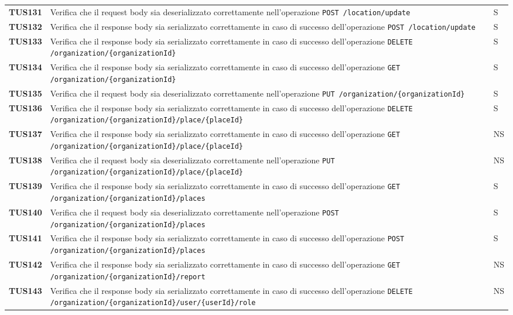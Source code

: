 \documentclass[../../piano-di-qualifica.tex]{subfiles}
\begin{document}
\begin{longtable}[H]{>{\centering\bfseries}m{3cm} >{}m{10cm} >{\centering\arraybackslash}m{3cm}}

  TUS131 & Verifica che il request body sia deserializzato correttamente nell'operazione \verb|POST /location/update| & S \\
  TUS132 & Verifica che il response body sia serializzato correttamente in caso di successo dell'operazione \verb|POST /location/update| & S \\
  TUS133 & Verifica che il response body sia serializzato correttamente in caso di successo dell'operazione \verb|DELETE /organization/{organizationId}| & S \\
  TUS134 & Verifica che il response body sia serializzato correttamente in caso di successo dell'operazione \verb|GET /organization/{organizationId}| & S \\
  TUS135 & Verifica che il request body sia deserializzato correttamente nell'operazione \verb|PUT /organization/{organizationId}| & S \\
  TUS136 & Verifica che il response body sia serializzato correttamente in caso di successo dell'operazione \verb|DELETE /organization/{organizationId}/place/{placeId}| & S \\
  TUS137 & Verifica che il response body sia serializzato correttamente in caso di successo dell'operazione \verb|GET /organization/{organizationId}/place/{placeId}| & NS \\
  TUS138 & Verifica che il request body sia deserializzato correttamente nell'operazione \verb|PUT /organization/{organizationId}/place/{placeId}| & NS \\
  TUS139 & Verifica che il response body sia serializzato correttamente in caso di successo dell'operazione \verb|GET /organization/{organizationId}/places| & S \\
  TUS140 & Verifica che il request body sia deserializzato correttamente nell'operazione \verb|POST /organization/{organizationId}/places| & S \\
  TUS141 & Verifica che il response body sia serializzato correttamente in caso di successo dell'operazione \verb|POST /organization/{organizationId}/places| & S \\
  TUS142 & Verifica che il response body sia serializzato correttamente in caso di successo dell'operazione \verb|GET /organization/{organizationId}/report| & NS \\
  TUS143 & Verifica che il response body sia serializzato correttamente in caso di successo dell'operazione \verb|DELETE /organization/{organizationId}/user/{userId}/role| & NS \\

\end{longtable}
\end{document}
